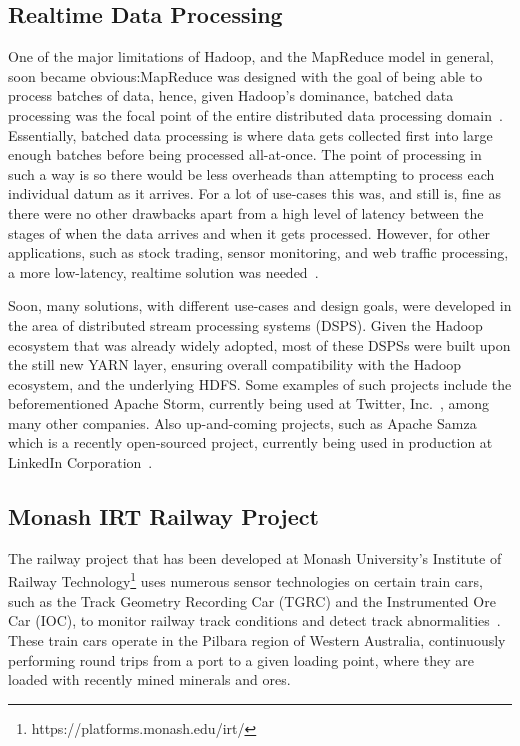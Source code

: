 
\subsection{Realtime Data Processing} %
\label{sub:prop_realtime_data_processing}

One of the major limitations of Hadoop, and the MapReduce model in general, soon became obvious:\@ MapReduce was designed
with the goal of being able to process batches of data, hence, given Hadoop's dominance, batched data processing was the
focal point of the entire distributed data processing domain~\cite{kamburugamuve_survey_2014}. Essentially, batched data
processing is where data gets collected first into large enough batches before being processed all-at-once. The point of
processing in such a way is so there would be less overheads than attempting to process each individual datum as it
arrives. For a lot of use-cases this was, and still is, fine as there were no other drawbacks apart from a high level of
latency between the stages of when the data arrives and when it gets processed. However, for other applications, such as
stock trading, sensor monitoring, and web traffic processing, a more low-latency, realtime solution was
needed~\cite{kamburugamuve_survey_2014}.

Soon, many solutions, with different use-cases and design goals, were developed in the area of distributed stream
processing systems (DSPS). Given the Hadoop ecosystem that was already widely adopted, most of these DSPSs were built
upon the still new YARN layer, ensuring overall compatibility with the Hadoop ecosystem, and the underlying HDFS. Some
examples of such projects include the beforementioned Apache Storm, currently being used at Twitter,
Inc.~\cite{toshniwal_stormtwitter_2014}, among many other companies. Also up-and-coming projects, such as Apache Samza
which is a recently open-sourced project, currently being used in production at LinkedIn Corporation~\cite{web:Samza}.


\subsection{Monash IRT Railway Project} %
\label{sub:monash_irt_railway_project}

The railway project that has been developed at Monash University's Institute of Railway Technology\footnote{https://platforms.monash.edu/irt/}
uses numerous sensor
technologies on certain train cars, such as the Track Geometry Recording Car (TGRC) and the Instrumented Ore Car (IOC),
to monitor railway track conditions and detect track abnormalities~\cite{darby2003development,darby2005track}.
These train cars operate in the Pilbara region of Western Australia, continuously performing round trips from a port
to a given loading point, where they are loaded with recently mined minerals and ores.

